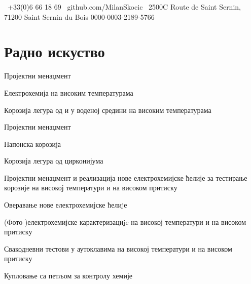 \documentclass[11pt, a4paper, notitlepage]{article}
\begin{document}
\selectfont
\pagestyle{empty}
	\newpage

	
	
	{{\selectfont\ +33(0)6 66 18 69}}
	{{\selectfont\ github.com/MilanSkocic}}
	{{\selectfont\ 2500C Route de Saint Sernin, 71200 Saint Sernin du Bois}}
	{0000-0003-2189-5766}

	\section*{Радно искуство}

	\begin{jobdetails}[OT2]
		\item Пројектни менаџмент
 		\item Електрохемија на високим температурама
		\item Корозија легура од  и  у воденој средини на високим температурама
	\end{jobdetails}
		
	\begin{jobdetails}[OT2]
		\item Пројектни менаџмент
		\item Напонска корозија 
		\item Корозија легура од цирконијума
	\end{jobdetails}

	\begin{jobdetails}[OT2]
		\item Пројектни менаџмент и реализација нове електрохемијске ћелије за тестирање корозије на високој температури и на високом притиску
		\item Оверавање нове електрохемијске ћелиjе
		\item (Фото-)електрохемијске карактеризациje на високој температури и на високом притиску
		\item Свакодневни тестови у аутоклавима на високој температури и на високом притиску
		\item Купловање са петљом за контролу хемије
	\end{jobdetails}
	
\end{document}
